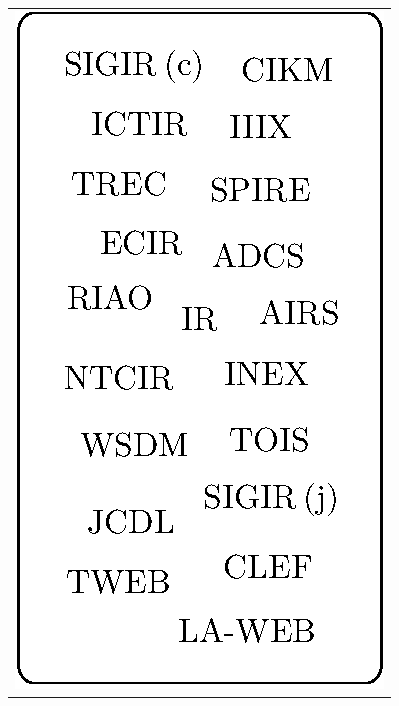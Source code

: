 \documentclass[msc]{ppgccufmg}
\begin{document}
\begin{table}[htbp]
\begin{tabular}{c}
\multirow{20}{*}{\includegraphics{fig/ir-norm-venues-blob.eps}} \\ %
\\
\\
\\
\\
\\
\\
\\
\\
\\
\\
\\
\\
\\
\\
\\
\\
\\
\\
\\
\bottomrule
\end{tabular} \ \

\end{table}
\end{document}
